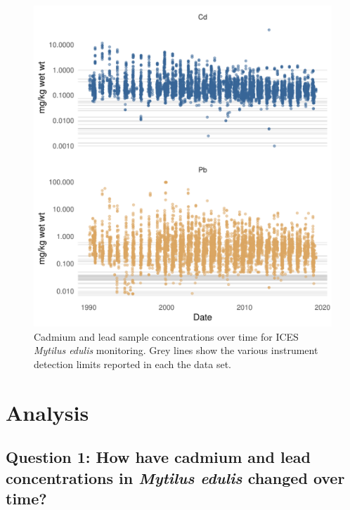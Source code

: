 \documentclass[
  12pt,
]{article}
\begin{document}
\begin{figure}
\centering
\includegraphics{McCrory_ENV972_Project_files/figure-latex/unnamed-chunk-6-1.pdf}
\caption{Cadmium and lead sample concentrations over time for ICES
\emph{Mytilus edulis} monitoring. Grey lines show the various instrument
detection limits reported in each the data set.}
\end{figure}

\newpage

\hypertarget{analysis}{%
\section{Analysis}\label{analysis}}

\hypertarget{question-1-how-have-cadmium-and-lead-concentrations-in-mytilus-edulis-changed-over-time}{%
\subsection{\texorpdfstring{Question 1: How have cadmium and lead
concentrations in \emph{Mytilus edulis} changed over
time?}{Question 1: How have cadmium and lead concentrations in Mytilus edulis changed over time?}}\label{question-1-how-have-cadmium-and-lead-concentrations-in-mytilus-edulis-changed-over-time}}
\end{document}
